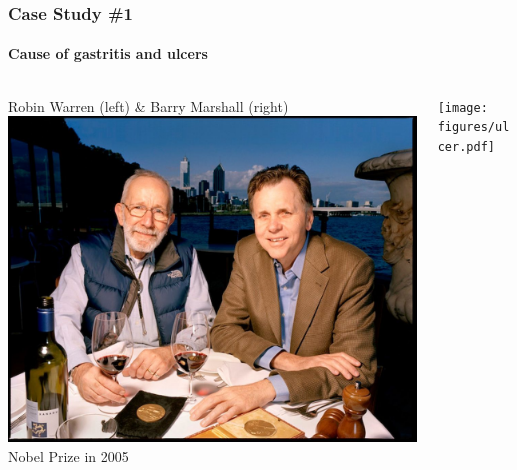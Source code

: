 \documentclass[10pt]{beamer}
\begin{document}
\begin{frame}[t]
\frametitle{Case Study \#1}
\framesubtitle{Cause of gastritis and ulcers}

	\begin{columns}
		\begin{column}{0.4\textwidth}
			\begin{center}
				Robin Warren (left) \& Barry Marshall (right)\\
				\vspace{0.2cm}
				\includegraphics[width=1.0\textwidth]{figures/warren.jpg}\\
				\vspace{0.2cm}
				Nobel Prize in 2005
			\end{center}
		\end{column}
		
		\begin{column}{0.6\textwidth}
			\begin{center}
				\texttt{[image: figures/ulcer.pdf]}
			\end{center}
		\end{column}
	\end{columns}
\end{frame}
\end{document}
